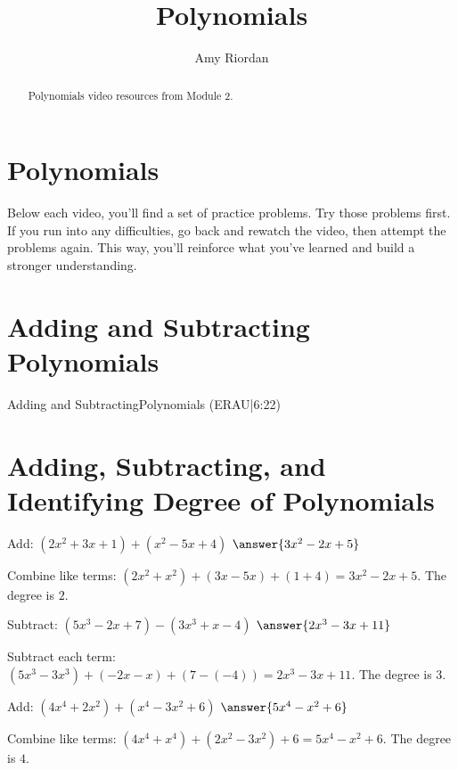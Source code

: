 \documentclass{ximera}
\title{Polynomials}
\author{Amy Riordan}
\begin{document}
\begin{abstract}
Polynomials video resources from Module 2.
\end{abstract}
\maketitle

\section*{Polynomials}

Below each video, you’ll find a set of practice problems. Try those problems first. If you run into any difficulties, go back and rewatch the video, then attempt the problems again. This way, you’ll reinforce what you’ve learned and build a stronger understanding.

\section*{Adding and Subtracting Polynomials}

Adding and SubtractingPolynomials (ERAU|6:22)



\section*{Adding, Subtracting, and Identifying Degree of Polynomials}

\begin{problem}
Add: $(2x^2 + 3x + 1) + (x^2 - 5x + 4)$ $\answer{3x^2 - 2x + 5}$
\begin{feedback}
Combine like terms: $(2x^2 + x^2) + (3x - 5x) + (1 + 4) = 3x^2 - 2x + 5$. The degree is $2$.
\end{feedback}
\end{problem}

\begin{problem}
Subtract: $(5x^3 - 2x + 7) - (3x^3 + x - 4)$ $\answer{2x^3 - 3x + 11}$
\begin{feedback}
Subtract each term: $(5x^3 - 3x^3) + (-2x - x) + (7 - (-4)) = 2x^3 - 3x + 11$. The degree is $3$.
\end{feedback}
\end{problem}

\begin{problem}
Add: $(4x^4 + 2x^2) + (x^4 - 3x^2 + 6)$ $\answer{5x^4 - x^2 + 6}$
\begin{feedback}
Combine like terms: $(4x^4 + x^4) + (2x^2 - 3x^2) + 6 = 5x^4 - x^2 + 6$. The degree is $4$.
\end{feedback}
\end{problem}
\end{document}
